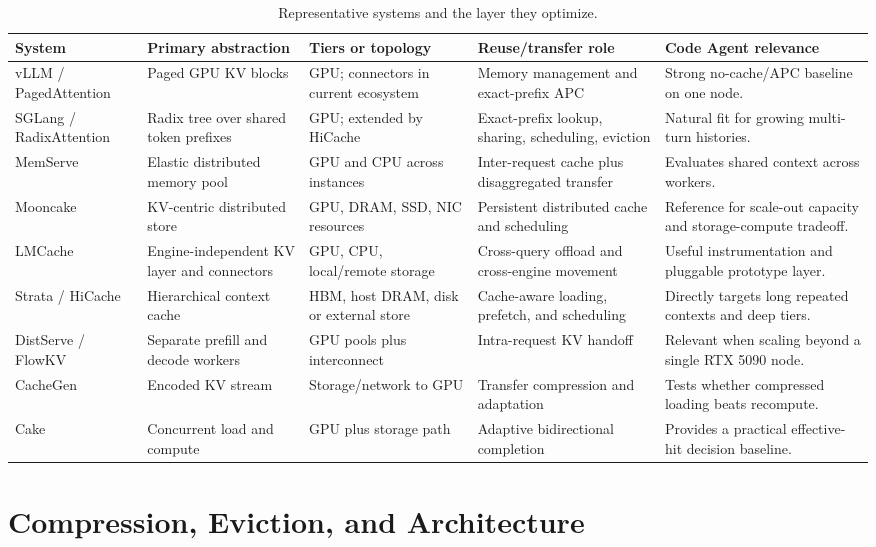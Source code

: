 \documentclass[conference,10pt]{IEEEtran}
\begin{document}
\begin{table}[t]
\caption{Representative systems and the layer they optimize.}
\label{tab:systems}
\centering
\scriptsize
\begin{tabularx}{\textwidth}{p{}p{}p{}p{}Y}
\toprule
System & Primary abstraction & Tiers or topology & Reuse/transfer role & Code Agent relevance \\
\midrule
vLLM / PagedAttention & Paged GPU KV blocks & GPU; connectors in current ecosystem & Memory management and exact-prefix APC & Strong no-cache/APC baseline on one node. \\
SGLang / RadixAttention & Radix tree over shared token prefixes & GPU; extended by HiCache & Exact-prefix lookup, sharing, scheduling, eviction & Natural fit for growing multi-turn histories. \\
MemServe & Elastic distributed memory pool & GPU and CPU across instances & Inter-request cache plus disaggregated transfer & Evaluates shared context across workers. \\
Mooncake & KV-centric distributed store & GPU, DRAM, SSD, NIC resources & Persistent distributed cache and scheduling & Reference for scale-out capacity and storage-compute tradeoff. \\
LMCache & Engine-independent KV layer and connectors & GPU, CPU, local/remote storage & Cross-query offload and cross-engine movement & Useful instrumentation and pluggable prototype layer. \\
Strata / HiCache & Hierarchical context cache & HBM, host DRAM, disk or external store & Cache-aware loading, prefetch, and scheduling & Directly targets long repeated contexts and deep tiers. \\
DistServe / FlowKV & Separate prefill and decode workers & GPU pools plus interconnect & Intra-request KV handoff & Relevant when scaling beyond a single RTX 5090 node. \\
CacheGen & Encoded KV stream & Storage/network to GPU & Transfer compression and adaptation & Tests whether compressed loading beats recompute. \\
Cake & Concurrent load and compute & GPU plus storage path & Adaptive bidirectional completion & Provides a practical effective-hit decision baseline. \\
\bottomrule
\end{tabularx}
\end{table}

\section{Compression, Eviction, and Architecture}
\end{document}
